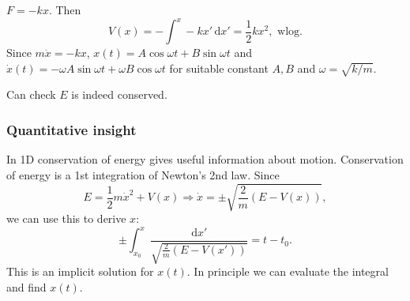 \begin{example}
    $ F=-kx $. Then 
    \[
        V(x) = - \int^{x} -kx' \,\mathrm{d}x' = \frac{1}{2}k x^2,\text{ wlog}.
    \]
    Since $ m \ddot{x} = -kx $, $ x(t) = A \cos \omega t+B \sin \omega t $ and $ \dot{x}(t) = -\omega A \sin \omega t+\omega B \cos \omega t $ for suitable constant $ A,B $ and $ \omega=\sqrt{k/m} $.

    Can check $E$ is indeed conserved.
\end{example}

\subsubsection*{Quantitative insight}
In 1D conservation of energy gives useful information about motion. Conservation of energy is a 1st integration of Newton's 2nd law. Since 
\[
    E= \frac{1}{2}m \dot{x}^2 + V(x) \Longrightarrow \dot{x} = \pm \sqrt{\frac{2}{m}(E-V(x))},
\]
we can use this to derive $x$:
\[
    \pm \int_{x_0}^{x} \frac{\mathrm{d}x'}{\sqrt{\frac{2}{m}(E-V(x'))}} = t-t_0.
\]
This is an implicit solution for $x(t)$. In principle we can evaluate the integral and find $x(t)$.

